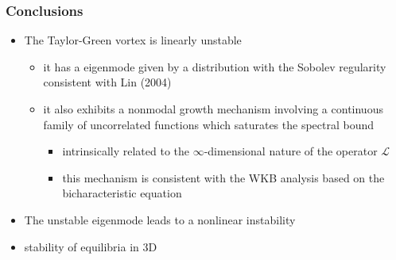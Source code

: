 \documentclass{beamer}
\def\Bmp#1{ \begin{minipage}{#1} }
\def\Emp{ \end{minipage} }
\def\L{{\mathcal{L}}}
\def\TT{{\mathbb{T}}}
\def\red#1{{\color{red}{ #1 }}}
\def\blue#1{{\color{blue}{ #1 }}}
\begin{document}
\frame
{
\frametitle{Conclusions}
\vspace{-0.1cm}
\hspace*{-1.0cm}
\Bmp{12cm}
\raggedright
\small
\begin{itemize}
\item<1-> The Taylor-Green vortex is linearly unstable
  \begin{itemize}
\item<2-> it has a eigenmode given by a distribution with the Sobolev
  regularity consistent with Lin (2004)
  \smallskip 
\item<3-> it also exhibits a nonmodal growth mechanism involving a
  continuous family of uncorrelated functions which saturates the
  spectral bound
 \begin{itemize}
 \item<4-> intrinsically related to the $\infty$-dimensional nature of the operator $\L$ 
 \smallskip
 \item<5-> this mechanism is consistent with the WKB analysis based on
   the bicharacteristic equation
\end{itemize}
\end{itemize}

\bigskip
\item<6-> The unstable eigenmode leads to a nonlinear instability
  
\bigskip  
\item<7-> \red{\sc Open Question:} stability of equilibria in 3D
\end{itemize}
\Emp
}
\end{document}
